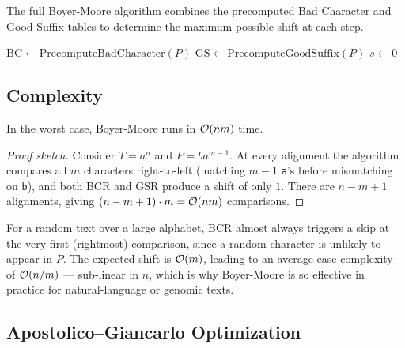 The full Boyer-Moore algorithm combines the precomputed Bad Character and Good Suffix tables to determine the maximum possible shift at each step.

\begin{algorithm}[H]
  \caption{Boyer-Moore Pattern Matching}
  $\mathrm{BC} \leftarrow \text{PrecomputeBadCharacter}(P)$\;
  $\mathrm{GS} \leftarrow \text{PrecomputeGoodSuffix}(P)$\;
  $s \leftarrow 0$ 
\end{algorithm}

\subsection{Complexity}

\begin{theorem}
  In the worst case, Boyer-Moore runs in $\mathcal{O}\!\left(nm\right)$ time.
\end{theorem}

\begin{proof}[Proof sketch]
  Consider $T = a^n$ and $P = ba^{m-1}$.
  At every alignment the algorithm compares all $m$ characters right-to-left
  (matching $m{-}1$ \texttt{a}'s before mismatching on \texttt{b}), and both
  BCR and GSR produce a shift of only $1$.
  There are $n - m + 1$ alignments, giving $(n-m+1)\cdot m = \mathcal{O}\!\left(nm\right)$ comparisons.
\end{proof}

\begin{remark}
  For a random text over a large alphabet, BCR almost always triggers a skip
  at the very first (rightmost) comparison, since a random character is
  unlikely to appear in $P$.
  The expected shift is $\mathcal{O}\!\left(m\right)$, leading to an average-case complexity of
  $\mathcal{O}\!\left(n/m\right)$ --- sub-linear in $n$, which is why Boyer-Moore is so effective
  in practice for natural-language or genomic texts.
\end{remark}

\subsection{Apostolico--Giancarlo Optimization}

